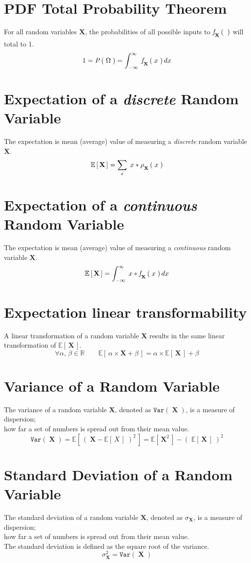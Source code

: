 \documentclass{article}
\newcommand{\Parens}[1]{\ensuremath{\left(\;#1\;\right)}\xspace}
\newcommand{\Prob}[1]{\ensuremath{\mathit{P}\Parens{#1}}\xspace}
\newcommand{\RandVar}[1]{\ensuremath{\mathbf{#1}}\xspace}
\newcommand{\Reals}{\ensuremath{\mathbb{R}}\xspace}
\newcommand{\PMF}[2]{%
\expandafter\ifx\expandafter\relax%
\detokenize{#2}\relax\ensuremath{\rho_{{\textstyle\mathstrut}\RandVar{#1}}}\xspace\else\ensuremath{\rho_{{\textstyle\mathstrut}\RandVar{#1}}\Parens{#2}}\xspace\fi}
\newcommand{\PDF}[2]{%
\expandafter\ifx\expandafter\relax%
\detokenize{#2}\relax\ensuremath{\mathit{f}_{{\textstyle\mathstrut}\RandVar{#1}}}\xspace\else\ensuremath{\mathit{f}_{\RandVar{{\textstyle\mathstrut}#1}}\Parens{#2}}\xspace\fi}
\newcommand{\Expect}[1]{\ensuremath{\mathbb{E}\left[\,#1\,\right]}\xspace}
\newcommand{\Variance}[1]{\ensuremath{\mathtt{Var}\Parens{#1}}\xspace}
\begin{document}
\section*{PDF Total Probability Theorem}
For all random variables $\RandVar{X}$, the probabilities of all possible inputs to $\PDF{X}{}$ will total to 1.
\[
1 = \Prob{\Omega} = \int_{-\infty}^{\infty}\; \PDF{X}{x}dx
\]


\pagebreak


\section*{Expectation of a \emph{discrete} Random Variable}
The expectation is mean (average) value of measuring a \emph{discrete} random variable \RandVar{X}.
\[
\Expect{\RandVar{X}} = \sum\limits_{x}\; x*\PMF{X}{x}
\]


\section*{Expectation of a \emph{continuous} Random Variable}
The expectation is mean (average) value of measuring a \emph{continuous} random variable \RandVar{X}.
\[
\Expect{\RandVar{X}} =\int_{-\infty}^{\infty}\; x*\PDF{X}{x}dx
\]


\section*{Expectation linear transformability}
A linear transformation of a random variable \RandVar{X} results in the same linear transformation of \Expect{\RandVar{X}}.
\[
\forall \alpha,\,\beta \in \Reals\qquad\Expect{\alpha \times \RandVar{X} + \beta} = \alpha \times \Expect{\RandVar{X}} + \beta 
\]


\section*{Variance of a Random Variable}
The variance of a random variable \RandVar{X}, denoted as \Variance{\RandVar{X}}, is a measure of dispersion;\\how far a set of numbers is spread out from their mean value.
\[
\Variance{\RandVar{X}} = \Expect{\Parens{\RandVar{X} - \Expect{X}}^2} = \Expect{\RandVar{X}^2} - \Parens{\Expect{\RandVar{X}}}^2
\]


\section*{Standard Deviation of a Random Variable}
The standard deviation of a random variable \RandVar{X}, denoted as $\sigma_{\RandVar{X}}$, is a measure of dispersion;\\how far a set of numbers is spread out from their mean value.\\[2mm]
The standard deviation is defined as the square root of the variance.
\[
\sigma_{\RandVar{X}}^2 = \Variance{\RandVar{X}}
\]
\end{document}
